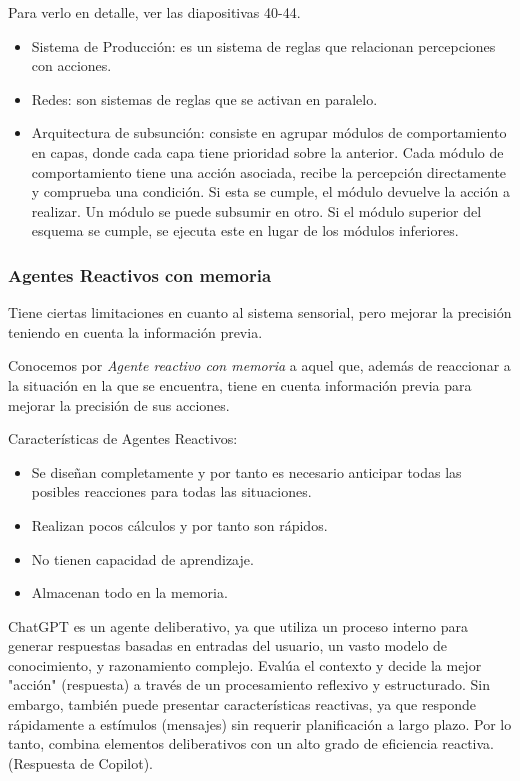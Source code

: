 Para verlo en detalle, ver las diapositivas 40-44.

\begin{itemize}
    \item Sistema de Producción: es un sistema de reglas que relacionan percepciones con acciones.
    \item Redes: son sistemas de reglas que se activan en paralelo.
    \item Arquitectura de subsunción: consiste en agrupar módulos de comportamiento en capas, donde cada capa tiene prioridad sobre la anterior. Cada módulo de comportamiento tiene una
    acción asociada, recibe la percepción
    directamente y comprueba una condición. Si esta
    se cumple, el módulo devuelve la acción a
    realizar.
    Un módulo se puede subsumir en otro. Si el
    módulo superior del esquema se cumple, se
    ejecuta este en lugar de los módulos inferiores.
\end{itemize}

\subsubsection{Agentes Reactivos con memoria}

Tiene ciertas limitaciones en cuanto al sistema sensorial, pero mejorar la precisión teniendo en cuenta la información previa.

Conocemos por \textit{Agente reactivo con memoria} a aquel que, además de reaccionar a la situación en la que se encuentra, tiene en cuenta información previa para mejorar la precisión de sus acciones.

Características de Agentes Reactivos:

\begin{itemize}
    \item Se diseñan completamente y por tanto es necesario anticipar todas
    las posibles reacciones para todas las situaciones.
    \item Realizan pocos cálculos y por tanto son rápidos.
    \item No tienen capacidad de aprendizaje.
    \item Almacenan todo en la memoria.
\end{itemize}

\begin{tcolorbox}[colback=yellow!10!white, colframe=yellow!90!black, title=¿Qué tipo de agente es ChatGPT?]
ChatGPT es un agente deliberativo, ya que utiliza un
proceso interno para generar respuestas basadas en
entradas del usuario, un vasto modelo de
conocimiento, y razonamiento complejo. Evalúa el
contexto y decide la mejor "acción" (respuesta) a
través de un procesamiento reflexivo y estructurado.
Sin embargo, también puede presentar características
reactivas, ya que responde rápidamente a estímulos
(mensajes) sin requerir planificación a largo plazo. Por
lo tanto, combina elementos deliberativos con un alto
grado de eficiencia reactiva. (Respuesta de Copilot).
\end{tcolorbox}
